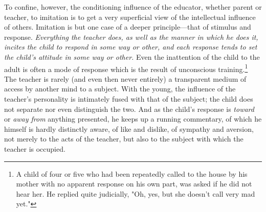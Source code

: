 \documentclass[letterpaper]{book}
\begin{document}
To confine, however, the conditioning influence of the educator, whether
parent or teacher, to imitation is to get a very superficial view of the
intellectual influence of others. Imitation is but one case of a deeper
principle---that of stimulus and response. \emph{Everything the teacher
does, as well as the manner in which he does it, incites the child to
respond in some way or other, and each response tends to set the child's
attitude in some way or other.} Even the inattention of the child to the
adult is often a mode of response which is the result of unconscious
training.\footnote{
A child of four or five who had been repeatedly called to the house by
his mother with no apparent response on his own part, was asked if he
did not hear her. He replied quite judicially, "Oh, yes, but she doesn't
call very mad yet."
}
The teacher is rarely (and even then never entirely) a transparent
medium of access by another mind to a subject. With the young, the
influence of the teacher's personality is intimately fused with that of
the subject; the child does not
separate
nor even distinguish the two. And as the child's response is
\emph{toward} or \emph{away from} anything presented, he keeps up a
running commentary, of which he himself is hardly distinctly aware, of
like and dislike, of sympathy and aversion, not merely to the acts of
the teacher, but also to the subject with which the teacher is occupied.


\end{document}
